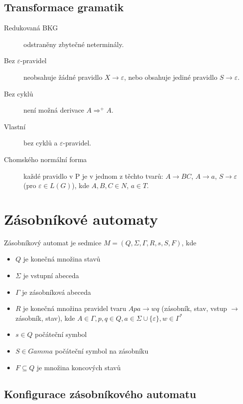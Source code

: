 \documentclass[a4wide]{report}
\begin{document}
\subsection{Transformace gramatik}

\begin{description}
	\item[Redukovaná BKG] odstraněny zbytečné neterminály.

	\item[Bez $\varepsilon$-pravidel] neobsahuje žádné pravidlo $X \to \varepsilon$, nebo obsahuje jediné pravidlo $S \to \varepsilon$.

	\item[Bez cyklů] není možná derivace $ A \Rightarrow^+ A $.

	\item[Vlastní] bez cyklů a $\varepsilon$-pravidel.

	\item[Chomského normální forma] každé pravidlo v P je v jednom z těchto tvarů: $A \to BC$, $A \to a$, $S \to \varepsilon$ (pro $\varepsilon \in L(G)$), kde $A,B,C \in N$, $a \in T$.
\end{description}

\section{Zásobníkové automaty}

Zásobníkový automat je sedmice $M = (Q, \Sigma, \Gamma, R, s, S, F)$, kde
\begin{itemize}
	\item $Q$ je konečná množina stavů
	\item $\Sigma$ je vstupní abeceda
	\item $\Gamma$ je zásobníková abeceda
	\item $R$ je konečná množina pravidel tvaru $Apa \to wq$ (zásobník, stav, vstup $\to$ zásobník, stav), kde $A \in \Gamma, p,q \in Q, a \in \Sigma \cup \{ \varepsilon \}, w \in \Gamma^*$
	\item $s \in Q$ počáteční symbol
	\item $S \in Gamma$ počáteční symbol na zásobníku
	\item $F \subseteq Q$ je množina koncových stavů
\end{itemize}

\subsection{Konfigurace zásobníkového automatu}
\end{document}
